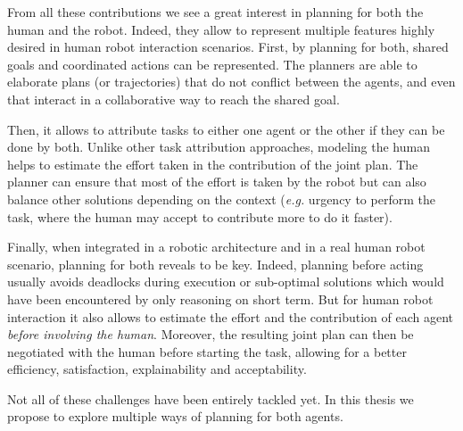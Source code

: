 \documentclass[a4paper,11pt,twoside]{StyleThese}
\begin{document}
From all these contributions we see a great interest in planning for both the human and the robot. Indeed, they allow to represent multiple features highly desired in human robot interaction scenarios. First, by planning for both, shared goals and coordinated actions can be represented. The planners are able to elaborate plans (or trajectories) that do not conflict between the agents, and even that interact in a collaborative way to reach the shared goal. 

Then, it allows to attribute tasks to either one agent or the other if they can be done by both. Unlike other task attribution approaches, modeling the human helps to estimate the effort taken in the contribution of the joint plan. The planner can ensure that most of the effort is taken by the robot but can also balance other solutions depending on the context (\textit{e.g.} urgency to perform the task, where the human may accept to contribute more to do it faster). 

Finally, when integrated in a robotic architecture and in a real human robot scenario, planning for both reveals to be key. Indeed, planning before acting usually avoids deadlocks during execution or sub-optimal solutions which would have been encountered by only reasoning on short term. But for human robot interaction it also allows to estimate the effort and the contribution of each agent \textit{before involving the human}. Moreover, the resulting joint plan can then be negotiated with the human before starting the task, allowing for a better efficiency, satisfaction, explainability and acceptability.

Not all of these challenges have been entirely tackled yet. In this thesis we propose to explore multiple ways of planning for both agents. 

\ifdefined{}
\else


\end{document}
